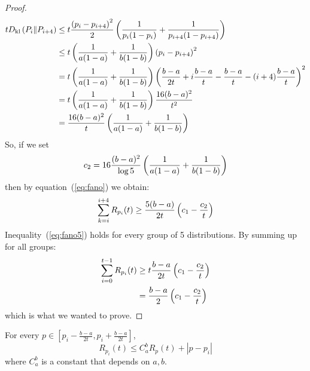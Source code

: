 \begin{proof}
\begin{align*}
    t D_{\mathrm{kl}} \left(P_i\|P_{i+4}\right) &\leq
    t \frac{\left(p_i - p_{i+4}\right)^2}{2}\left(\frac{1}{p_i(1-p_i)} + \frac{1}{p_{i+4}(1-p_{i+4})}\right)\\
    &\leq
    t\left(\frac{1}{a(1-a)} + \frac{1}{b(1-b)}\right) \left(p_i - p_{i+4}\right)^2\\
    &=
    t\left(\frac{1}{a(1-a)} + \frac{1}{b(1-b)}\right)\left(\frac{b-a}{2t} +
    i\frac{b-a}{t} - \frac{b-a}{t} -(i+4)\frac{b-a}{t}\right)^2\\
    &=
    t\left(\frac{1}{a(1-a)} + \frac{1}{b(1-b)}\right) \frac{16(b-a)^2}{t^2}\\
    &=
    \frac{16(b-a)^2}{t} \left(\frac{1}{a(1-a)} + \frac{1}{b(1-b)}\right)
  \end{align*}
  So, if we set
  $$c_2 = 16\frac{(b-a)^2}{\log5}\left(\frac{1}{a(1-a)} + \frac{1}{b(1-b)}\right)$$
  then by equation~(\ref{eq:fano}) we obtain:
  \begin{equation}\label{eq:fano5}
    \sum_{k =i}^{i+4}R_{p_i}(t) \geq \frac{5(b-a)}{2t}\left(c_1 - \frac{c_2}{t}\right)
  \end{equation}
  Inequality~(\ref{eq:fano5}) holds for every group of 5
  distributions. By summing up for all groups:
  \begin{align*}
    \sum_{i=0}^{t-1} R_{p_i}(t) &\geq t \frac{b-a}{2t}\left(c_1 - \frac{c_2}{t}\right)\\
    &= \frac{b-a}{2}\left(c_1 - \frac{c_2}{t}\right)
  \end{align*}
  which is what we wanted to prove.
\end{proof}
\begin{lemma}\label{l:ratio}
For every $p\in [p_i -\frac{b-a}{2t},p_i + \frac{b-a}{2t}]$,
\[R_{p_i}(t) \leq C_a^b R_{p}(t) +  |p-p_i|\]
where $C_a^b$ is a constant that depends on $a,b$.
\end{lemma}
